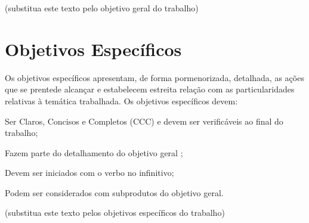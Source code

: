 (substitua este texto pelo objetivo geral do trabalho)

\section{Objetivos Específicos}
\label{sec:objespc}
Os objetivos específicos apresentam, de forma pormenorizada, detalhada, as ações que se prentede alcançar e estabelecem estreita relação com as particularidades relativas à temática trabalhada. Os objetivos específicos devem:

Ser Claros, Concisos e Completos (CCC) e devem ser verificáveis ao final do trabalho;

Fazem parte do detalhamento do objetivo geral ;

Devem ser iniciados com o verbo no infinitivo;

Podem ser considerados com subprodutos do objetivo geral.

(substitua este texto pelos objetivos específicos do trabalho)

  


